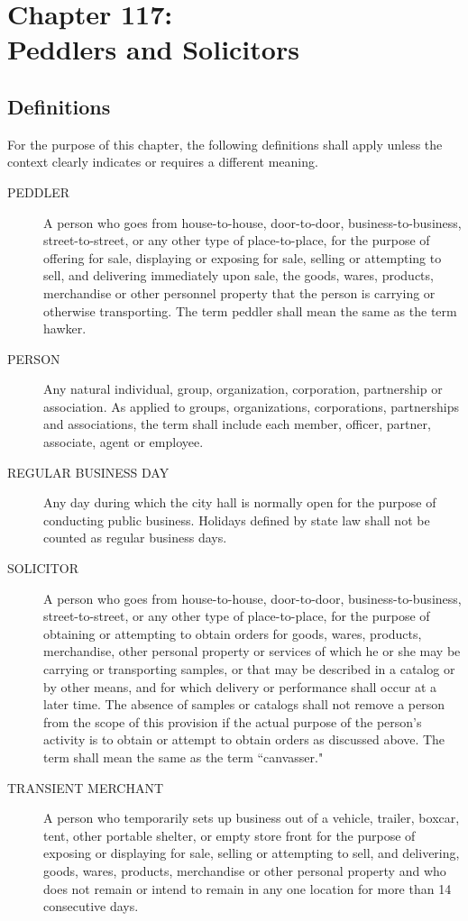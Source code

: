 \chapter*{Chapter 117: \\
	Peddlers and Solicitors}
    \vfill
    \minitoc
    \pagebreak

\section{Definitions}
For the purpose of this chapter, the following definitions shall apply unless the context clearly indicates or requires a different meaning.
\begin{description}
    \item[PEDDLER] A person who goes from house-to-house, door-to-door, business-to-business, street-to-street, or any other type of place-to-place, for the purpose of offering for sale, displaying or exposing for sale, selling or attempting to sell, and delivering immediately upon sale, the goods, wares, products, merchandise or other personnel property that the person is carrying or otherwise transporting. The term peddler shall mean the same as the term hawker.
    \item[PERSON] Any natural individual, group, organization, corporation, partnership or association. As applied to groups, organizations, corporations, partnerships and associations, the term shall include each member, officer, partner, associate, agent or employee.
    \item[REGULAR BUSINESS DAY] Any day during which the city hall is normally open for the purpose of conducting public business. Holidays defined by state law shall not be counted as regular business days.
    \item[SOLICITOR] A person who goes from house-to-house, door-to-door, business-to-business, street-to-street, or any other type of place-to-place, for the purpose of obtaining or attempting to obtain orders for goods, wares, products, merchandise, other personal property or services of which he or she may be carrying or transporting samples, or that may be described in a catalog or by other means, and for which delivery or performance shall occur at a later time. The absence of samples or catalogs shall not remove a person from the scope of this provision if the actual purpose of the person's activity is to obtain or attempt to obtain orders as discussed above. The term shall mean the same as the term “canvasser."
    \item[TRANSIENT MERCHANT] A person who temporarily sets up business out of a vehicle, trailer, boxcar, tent, other portable shelter, or empty store front for the purpose of exposing or displaying for sale, selling or attempting to sell, and delivering, goods, wares, products, merchandise or other personal property and who does not remain or intend to remain in any one location for more than 14 consecutive days.
\end{description}

